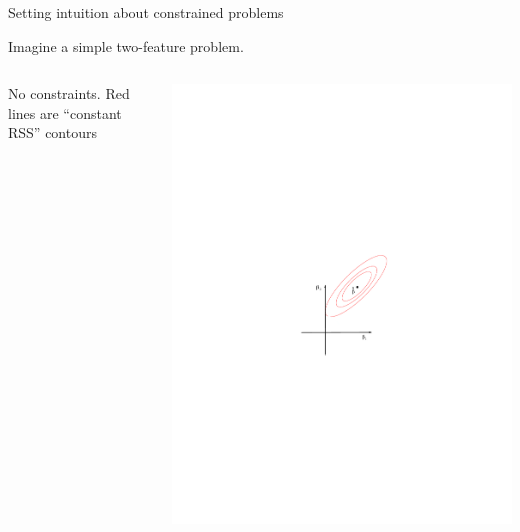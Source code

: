 \documentclass[mathserif, aspectratio=169]{beamer}
\begin{document}
\begin{frame}{Setting intuition about constrained problems}

Imagine a simple two-feature problem.  

\begin{columns}

\begin{center}
No constraints.  Red lines are ``constant RSS'' contours
\end{center}
\includegraphics[scale=0.65]{RSE_contour}


\end{columns}
\end{frame}
\end{document}

